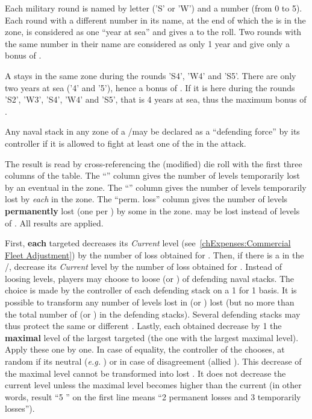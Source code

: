 \bparag Each military round is named by letter ('S' or 'W') and a number (from
0 to 5).
\bparag Each round with a different number in its name, at the end of which
the \corsaire is in the zone, is considered as one ``year at sea'' and gives a
 to the roll.
\bparag Two rounds with the same number in their name are considered as only 1
year and give only a bonus of .
\begin{exemple}
  A \corsaire stays in the same zone during the rounds 'S4', 'W4' and
  'S5'. There are only two years at sea ('4' and '5'), hence a bonus of
  . If it is here during the rounds 'S2', 'W3', 'S4', 'W4' and 'S5',
  that is 4 years at sea, thus the maximum bonus of .
\end{exemple}

 Any naval stack in any zone of a \STZ/\CTZ may
be declared as a ``defending force'' by its controller if it is allowed to
fight at least one of the \corsaire in the attack.


\bparag The result is read by cross-referencing the (modified) die roll with
the first three columns of the table.
\bparag The ``\TradeFLEET\faceplus'' column gives the number of levels
temporarily lost by an eventual \TradeFLEET\faceplus in the zone.
\bparag The ``\TradeFLEET\facemoins'' column gives the number of levels
temporarily lost by \emph{each} \TradeFLEET\facemoins in the zone.
\bparag The ``perm. loss'' column gives the number of levels
\textbf{permanently} lost (one per \textetoile) by some \TradeFLEET in the
zone.
\bparag \ND may be lost instead of levels of \TradeFLEET.
\bparag All results are applied.


\bparag First, \textbf{each} targeted \TradeFLEET\facemoins decreases its
\emph{Current} level (see~\ref{chExpenses:Commercial Fleet Adjustment}) by the
number of loss obtained for \TradeFLEET\facemoins.
\bparag Then, if there is a \TradeFLEET\faceplus in the \STZ/\CTZ, decrease
its \emph{Current} level by the number of loss obtained for
\TradeFLEET\faceplus.
\bparag Instead of loosing \TradeFLEET levels, players may choose to loose \ND
(or \NGD) of defending naval stacks. The choice is made by the controller of
each defending stack on a 1 for 1 basis. It is possible to transform any
number of levels lost in \ND (or \NGD) lost (but no more than the total number
of \ND (or \NGD) in the defending stacks). Several defending stacks may thus
protect the same or different \TradeFLEET.
\bparag Lastly, each \textetoile obtained decrease by 1 the \textbf{maximal}
level of the largest targeted \TradeFLEET (the one with the largest maximal
level). Apply these \textetoile one by one. In case of equality, the
controller of the \corsaire chooses, at random if its neutral (\emph{e.g.}
) or in case of disagreement (allied \corsaire).
\bparag This decrease of the maximal level cannot be transformed into lost
\ND. It does not decrease the current level unless the maximal level becomes
higher than the current (in other words, result ``5 \textetoile\textetoile''
on the first line means ``2 permanent losses and 3 temporarily losses'').

